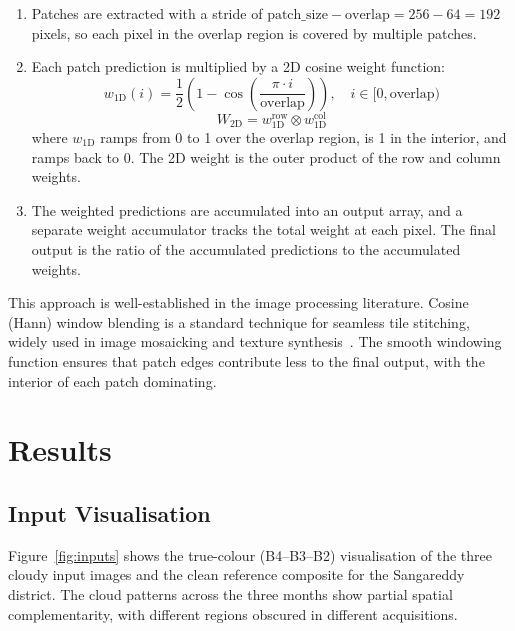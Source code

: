 \documentclass[12pt,a4paper]{article}
\begin{document}
\begin{enumerate}[leftmargin=2em]
    \item Patches are extracted with a stride of $\text{patch\_size} - \text{overlap} = 256 - 64 = 192$ pixels, so each pixel in the overlap region is covered by multiple patches.
    
    \item Each patch prediction is multiplied by a 2D cosine weight function:
    \begin{equation}
        w_{1\text{D}}(i) = \frac{1}{2}\left(1 - \cos\left(\frac{\pi \cdot i}{\text{overlap}}\right)\right), \quad i \in [0, \text{overlap})
    \end{equation}
    \begin{equation}
        W_{2\text{D}} = w_{1\text{D}}^{\text{row}} \otimes w_{1\text{D}}^{\text{col}}
    \end{equation}
    where $w_{1\text{D}}$ ramps from 0 to 1 over the overlap region, is 1 in the interior, and ramps back to 0. The 2D weight is the outer product of the row and column weights.
    
    \item The weighted predictions are accumulated into an output array, and a separate weight accumulator tracks the total weight at each pixel. The final output is the ratio of the accumulated predictions to the accumulated weights.
\end{enumerate}

This approach is well-established in the image processing literature. Cosine (Hann) window blending is a standard technique for seamless tile stitching, widely used in image mosaicking and texture synthesis~\cite{burt1983multiresolution}. The smooth windowing function ensures that patch edges contribute less to the final output, with the interior of each patch dominating.



\section{Results}

\subsection{Input Visualisation}

Figure~\ref{fig:inputs} shows the true-colour (B4--B3--B2) visualisation of the three cloudy input images and the clean reference composite for the Sangareddy district. The cloud patterns across the three months show partial spatial complementarity, with different regions obscured in different acquisitions.
\end{document}
